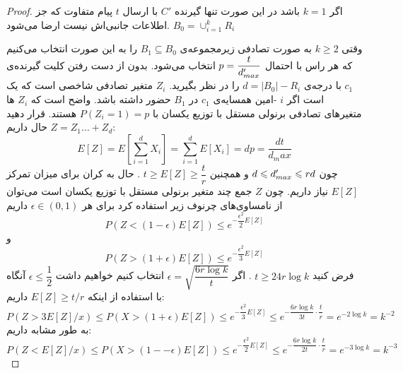 \begin{proof}
	اگر
	$k = 1$
	باشد در این صورت تنها گیرنده
	$C'$
	با ارسال
	$t$
	پیام متفاوت که جز اطلاعات جانبی‌اش نیست ارضا می‌شود.
	$B_0 = \cup_{i = 1}^{k} R_i$
	
	وقتی
	$k \geq 2$
	به صورت تصادفی زیرمجموعه‌ی
	$B_1 \subseteq B_0$
	را به این صورت انتخاب می‌کنیم که هر راس با احتمال
	$p = \dfrac{t}{d_{max}'}$
	انتخاب می‌شود. بدون از دست رفتن کلیت گیرنده‌ی
	$c_1$
	با درجه‌ی
	$d = |B_0| - R_i$
	را در نظر بگیرید.
	$Z_i$
	متغیر تصادفی شاخصی است که یک است اگر
	$i$
	-امین همسایه‌ی
	$c_1$
	در
	$B_1$
	حضور داشته باشد. واضح است که
	$Z_i$
	ها متغیرهای تصادفی برنولی مستقل با توزیع یکسان با
	$P(Z_i = 1) = p$
	هستند. قرار دهید
	$Z = Z_1 \ldots + Z_d$
	حال داریم:
	\begin{equation}
		E[Z] = E[\sum\limits_{i = 1}^{d} X_i ] = \sum\limits_{i = 1}^{d} E[X_i] = dp = \dfrac{dt}{d_max}
	\end{equation}
	چون
	$d \leqslant d_{max}' \leqslant rd$
	و همچنین
	$t \geq E[Z] \geq \dfrac{t}{r}$
	. حال به کران برای میزان تمرکز
	$E[Z]$
	نیاز داریم. چون
	$Z$
	جمع چند متغیر برنولی مستقل با توزیع یکسان است می‌توان از نامساوی‌های چرنوف زیر استفاده کرد
	\cite{Dubhashi_Panconesi_2009}
	برای هر
	$\epsilon \in (0, 1)$
	داریم
	$$P(Z < (1 - \epsilon) E[Z]) \leq e^{- \dfrac{\epsilon^2}{2} E[Z]}$$
	و
	$$P(Z > (1 + \epsilon) E[Z]) \leq e^{- \dfrac{\epsilon^2}{3} E[Z]}$$
	فرض کنید
	$t \geq 24 r \log k$
	. اگر
	$\epsilon = \sqrt{\dfrac{6r \log k}{t}}$
	انتخاب کنیم خواهیم داشت
	$\epsilon \leq \dfrac{1}{2}$
	آنگاه با استفاده از اینکه
	$E[Z] \geq t/r$
	داریم:
	\begin{equation}
		P(Z > 3 E[Z]/x) \leq P(X > (1 + \epsilon) E[Z]) \leq e^{-\dfrac{\epsilon^2}{3} E[Z]} \leq e^{- \dfrac{6 r \log k}{3 t} \cdot \dfrac{t}{r}} = e^{- 2 \log k} = k^{-2}
	\end{equation}
	به طور مشابه داریم:
		\begin{equation}
			P(Z < E[Z]/x) \leq P(X > (1 -- \epsilon) E[Z]) \leq e^{-\dfrac{\epsilon^2}{2} E[Z]} \leq e^{- \dfrac{6 r \log k}{2 t} \cdot \dfrac{t}{r}} = e^{-3 \log k} = k^{-3}
				\end{equation}
				

\end{proof}
